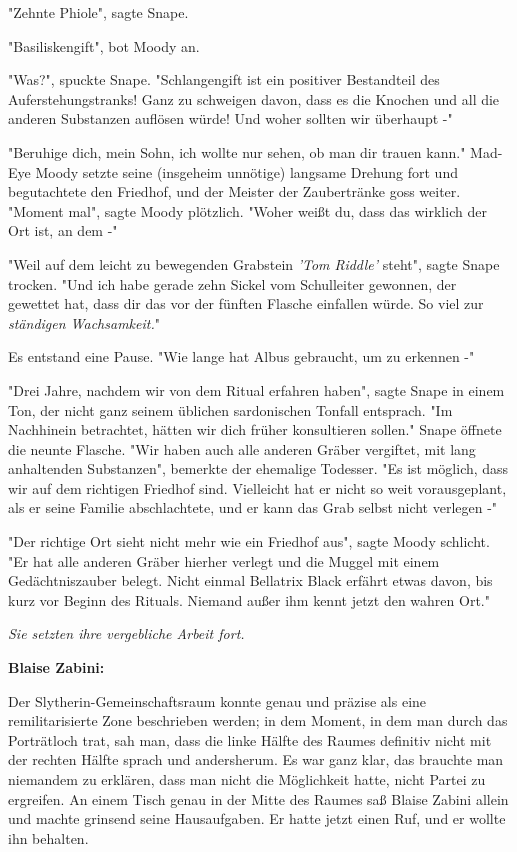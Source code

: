 {"Zehnte Phiole", sagte Snape.

"Basiliskengift", bot Moody an.

"Was?", spuckte Snape. "Schlangengift ist ein positiver Bestandteil des Auferstehungstranks! Ganz zu schweigen davon, dass es die Knochen und all die anderen Substanzen auflösen würde! Und woher sollten wir überhaupt -"

"Beruhige dich, mein Sohn, ich wollte nur sehen, ob man dir trauen kann." Mad-Eye Moody setzte seine (insgeheim unnötige) langsame Drehung fort und begutachtete den Friedhof, und der Meister der Zaubertränke goss weiter. "Moment mal", sagte Moody plötzlich. "Woher weißt du, dass das wirklich der Ort ist, an dem -"

"Weil auf dem leicht zu bewegenden Grabstein \emph{'Tom Riddle'} steht", sagte Snape trocken. "Und ich habe gerade zehn Sickel vom Schulleiter gewonnen, der gewettet hat, dass dir das vor der fünften Flasche einfallen würde. So viel zur \emph{ständigen Wachsamkeit.}"

Es entstand eine Pause. "Wie lange hat Albus gebraucht, um zu erkennen -"

"Drei Jahre, nachdem wir von dem Ritual erfahren haben", sagte Snape in einem Ton, der nicht ganz seinem üblichen sardonischen Tonfall entsprach. "Im Nachhinein betrachtet, hätten wir dich früher konsultieren sollen." Snape öffnete die neunte Flasche. "Wir haben auch alle anderen Gräber vergiftet, mit lang anhaltenden Substanzen", bemerkte der ehemalige Todesser. "Es ist möglich, dass wir auf dem richtigen Friedhof sind. Vielleicht hat er nicht so weit vorausgeplant, als er seine Familie abschlachtete, und er kann das Grab selbst nicht verlegen -"

"Der richtige Ort sieht nicht mehr wie ein Friedhof aus", sagte Moody schlicht. "Er hat alle anderen Gräber hierher verlegt und die Muggel mit einem Gedächtniszauber belegt. Nicht einmal Bellatrix Black erfährt etwas davon, bis kurz vor Beginn des Rituals. Niemand außer ihm kennt jetzt den wahren Ort."

\emph{Sie setzten ihre vergebliche Arbeit fort.}

\textbf{Blaise Zabini:}

Der Slytherin-Gemeinschaftsraum konnte genau und präzise als eine remilitarisierte Zone beschrieben werden; in dem Moment, in dem man durch das Porträtloch trat, sah man, dass die linke Hälfte des Raumes definitiv nicht mit der rechten Hälfte sprach und andersherum. Es war ganz klar, das brauchte man niemandem zu erklären, dass man nicht die Möglichkeit hatte, nicht Partei zu ergreifen. An einem Tisch genau in der Mitte des Raumes saß Blaise Zabini allein und machte grinsend seine Hausaufgaben. Er hatte jetzt einen Ruf, und er wollte ihn behalten.

}
